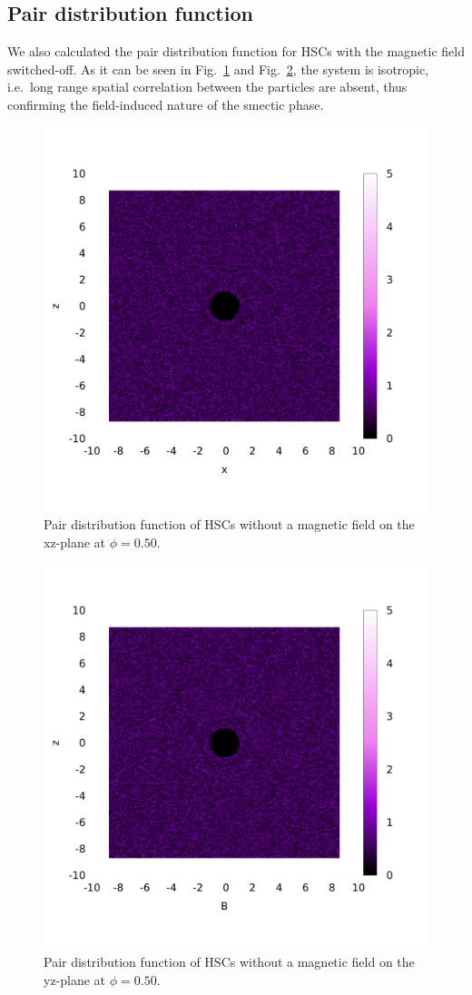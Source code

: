 \documentclass[aip,graphicx]{revtex4-1} %
\begin{document}
\subsection{Pair distribution function}

We also calculated the pair distribution function for HSCs with the magnetic field switched-off. 
As it can be seen in Fig.~\ref{fig:gxz_noB} and Fig.~\ref{fig:gyz_noB}, the system is isotropic, i.e.~long range
spatial correlation between the particles are absent, thus confirming the field-induced nature of the smectic phase.

\begin{figure}
    \centering
    \includegraphics[width=0.5\columnwidth]{gxz_noB.png}
    \caption{Pair distribution function of HSCs without a magnetic field on the xz-plane at $\phi=0.50$.}\label{fig:gxz_noB}
\end{figure}

\begin{figure}
    \centering
    \includegraphics[width=0.5\columnwidth]{gyz_noB.png}
    \caption{Pair distribution function of HSCs without a magnetic field on the yz-plane at $\phi=0.50$.}\label{fig:gyz_noB}
\end{figure}
\end{document}
